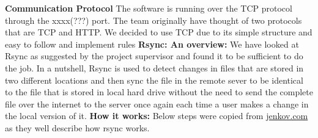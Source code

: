 \documentclass{article}
\begin{document}
\newline
\hfill \break
\textbf{Communication Protocol}
The software is running over the TCP protocol through the xxxx(???) port. The team originally have thought of two protocols that are TCP and HTTP. We decided to use TCP due to its simple structure and easy to follow and implement rules
\newline
\hfill \break
\textbf{Rsync: An overview:} We have looked at Rsync as suggested by the project supervisor and found it to be sufficient to do the job. In a nutshell, Rsync is used to detect changes in files that are stored in two different locations and then sync the file in the remote sever to be identical to the file that is stored in local hard drive without the need to send the complete file over the internet to the server once again each time a user makes a change in the local version of it.
\newline
\hfill \break
\textbf{How it works:}
Below steps were copied from \underline{jenkov.com} as they well describe how rsync works.
\end{document}
